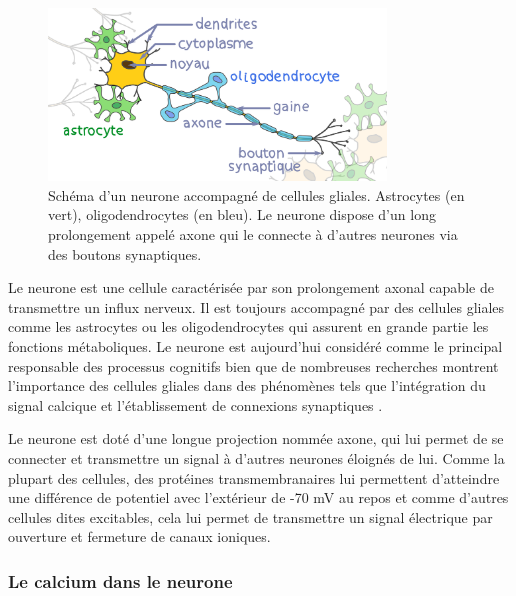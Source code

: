 \begin{figure}
  \centering
  \includegraphics[width=0.8\textwidth]{./files/neurone.svg.png}
  \caption{Schéma d'un neurone accompagné de cellules gliales. Astrocytes (en vert), oligodendrocytes (en bleu). Le neurone dispose d'un long prolongement appelé axone qui le connecte à d'autres neurones via des boutons synaptiques.}
  \end{figure}

Le neurone est une cellule caractérisée par son prolongement axonal capable de transmettre un influx nerveux. Il est toujours accompagné par des cellules gliales comme les astrocytes ou les oligodendrocytes qui assurent en grande partie les fonctions métaboliques. Le neurone est aujourd'hui considéré comme le principal responsable des processus cognitifs bien que de nombreuses recherches montrent l'importance des cellules gliales dans des phénomènes tels que l'intégration du signal calcique et l'établissement de connexions synaptiques \cite{verkhratsky_calcium_1996} \cite{pfrieger_synaptic_1997}.

Le neurone est doté d'une longue projection nommée axone, qui lui permet de se connecter et transmettre un signal à d'autres neurones éloignés de lui. Comme la plupart des cellules, des protéines transmembranaires lui permettent d'atteindre une différence de potentiel avec l'extérieur de -70 mV au repos et comme d'autres cellules dites excitables, cela lui permet de transmettre un signal électrique par ouverture et fermeture de canaux ioniques.

\subsubsection{Le calcium dans le neurone}

